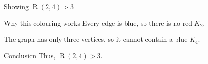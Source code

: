\documentclass[aspectratio=169,11pt]{beamer}
\newcommand{\Ram}{\operatorname{R}}
\begin{document}
\begin{frame}[t]{Showing $\Ram(2,4)>3$}
\vspace{0.05cm}

\begin{center}
\end{center}

\begin{block}{Why this colouring works}
\large
Every edge is \textcolor{RamBlue}{blue}, so there is no
\textcolor{RamRed}{red $K_2$}.

\vspace{0.18cm}

The graph has only three vertices, so it cannot contain a
\textcolor{RamBlue}{blue $K_4$}.
\end{block}

\begin{alertblock}{Conclusion}
\large
Thus, $\Ram(2,4)>3$.
\end{alertblock}
\end{frame}
\end{document}
